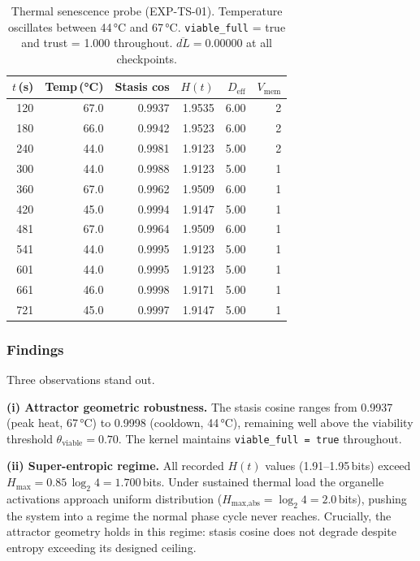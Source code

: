 \documentclass[11pt, a4paper]{article}
\begin{document}
\begin{table}[!htb]
\centering
\small
\begin{tabular}{rrrrrr}
\toprule
$t$\,(s) & Temp\,(°C) & Stasis cos & $H(t)$ & $D_\text{eff}$ & $V_\text{mem}$ \\
\midrule
120 & 67.0 & 0.9937 & 1.9535 & 6.00 & 2 \\
180 & 66.0 & 0.9942 & 1.9523 & 6.00 & 2 \\
240 & 44.0 & 0.9981 & 1.9123 & 5.00 & 2 \\
300 & 44.0 & 0.9988 & 1.9123 & 5.00 & 1 \\
360 & 67.0 & 0.9962 & 1.9509 & 6.00 & 1 \\
420 & 45.0 & 0.9994 & 1.9147 & 5.00 & 1 \\
481 & 67.0 & 0.9964 & 1.9509 & 6.00 & 1 \\
541 & 44.0 & 0.9995 & 1.9123 & 5.00 & 1 \\
601 & 44.0 & 0.9995 & 1.9123 & 5.00 & 1 \\
661 & 46.0 & 0.9998 & 1.9171 & 5.00 & 1 \\
721 & 45.0 & 0.9997 & 1.9147 & 5.00 & 1 \\
\bottomrule
\end{tabular}
\caption{Thermal senescence probe (EXP-TS-01).
Temperature oscillates between 44\,°C and 67\,°C.
\texttt{viable\_full} = true and trust = 1.000 throughout.
$\overline{dL} = 0.00000$ at all checkpoints.}
\label{tab:thermal_senescence}
\end{table}

\subsubsection*{Findings}

Three observations stand out.

\textbf{(i) Attractor geometric robustness.}
The stasis cosine ranges from 0.9937 (peak heat, 67\,°C) to 0.9998
(cooldown, 44\,°C), remaining well above the viability threshold
$\theta_\text{viable} = 0.70$.
The kernel maintains \texttt{viable\_full = true} throughout.

\textbf{(ii) Super-entropic regime.}
All recorded $H(t)$ values (1.91--1.95\,bits) exceed
$H_\text{max} = 0.85\,\log_2 4 = 1.700$\,bits.
Under sustained thermal load the organelle activations approach uniform
distribution ($H_\text{max,abs} = \log_2 4 = 2.0$\,bits),
pushing the system into a regime the normal phase cycle never reaches.
Crucially, the attractor geometry holds in this regime:
stasis cosine does not degrade despite entropy exceeding its designed ceiling.
\end{document}
